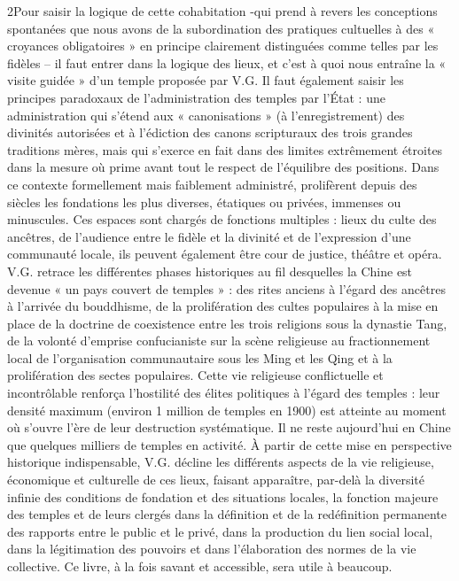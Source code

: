 2Pour saisir la logique de cette cohabitation -qui prend à revers les conceptions spontanées que nous avons de la subordination des pratiques cultuelles à des « croyances obligatoires » en principe clairement distinguées comme telles par les fidèles – il faut entrer dans la logique des lieux, et c’est à quoi nous entraîne la « visite guidée » d’un temple proposée par V.G. Il faut également saisir les principes paradoxaux de l’administration des temples par l’État : une administration qui s’étend aux « canonisations » (à l’enregistrement) des divinités autorisées et à l’édiction des canons scripturaux des trois grandes traditions mères, mais qui s’exerce en fait dans des limites extrêmement étroites dans la mesure où prime avant tout le respect de l’équilibre des positions. Dans ce contexte formellement mais faiblement administré, prolifèrent depuis des siècles les fondations les plus diverses, étatiques ou privées, immenses ou minuscules. Ces espaces sont chargés de fonctions multiples : lieux du culte des ancêtres, de l’audience entre le fidèle et la divinité et de l’expression d’une communauté locale, ils peuvent également être cour de justice, théâtre et opéra. V.G. retrace les différentes phases historiques au fil desquelles la Chine est devenue « un pays couvert de temples » : des rites anciens à l’égard des ancêtres à l’arrivée du bouddhisme, de la prolifération des cultes populaires à la mise en place de la doctrine de coexistence entre les trois religions sous la dynastie Tang, de la volonté d’emprise confucianiste sur la scène religieuse au fractionnement local de l’organisation communautaire sous les Ming et les Qing et à la prolifération des sectes populaires. Cette vie religieuse conflictuelle et incontrôlable renforça l’hostilité des élites politiques à l’égard des temples : leur densité maximum (environ 1 million de temples en 1900) est atteinte au moment où s’ouvre l’ère de leur destruction systématique. Il ne reste aujourd’hui en Chine que quelques milliers de temples en activité. À partir de cette mise en perspective historique indispensable, V.G. décline les différents aspects de la vie religieuse, économique et culturelle de ces lieux, faisant apparaître, par-delà la diversité infinie des conditions de fondation et des situations locales, la fonction majeure des temples et de leurs clergés dans la définition et de la redéfinition permanente des rapports entre le public et le privé, dans la production du lien social local, dans la légitimation des pouvoirs et dans l’élaboration des normes de la vie collective. Ce livre, à la fois savant et accessible, sera utile à beaucoup.